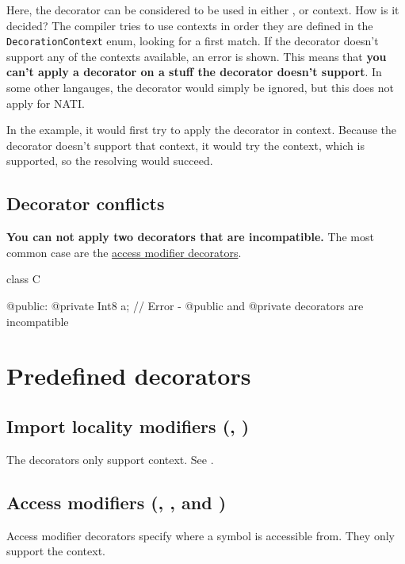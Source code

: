 Here, the  decorator can be considered to be used in either ,  or  context. How is it decided? The compiler tries to use contexts in order they are defined in the \verb|DecorationContext| enum, looking for a first match. If the decorator doesn't support any of the contexts available, an error is shown. This means that \textbf{you can't apply a decorator on a stuff the decorator doesn't support}. In some other langauges, the decorator would simply be ignored, but this does not apply for NATI.

In the example, it would first try to apply the decorator in   context. Because the  decorator doesn't support that context, it would try the   context, which is supported, so the resolving would succeed.

\subsection{Decorator conflicts}
\textbf{You can not apply two decorators that are incompatible.} The most common case are the \hyperref[accessModifierDecorators]{access modifier decorators}.
\begin{code}
class C {

@public:
	@private Int8 a; // Error - @public and @private decorators are incompatible
	
}
\end{code}

\section{Predefined decorators}

\subsection{Import locality modifiers (, )}
The decorators only support  context. See .

\subsection{Access modifiers (, ,  and )} \label{accessModifierDecorators}
Access modifier decorators specify where a symbol is accessible from. They only support the  context.

